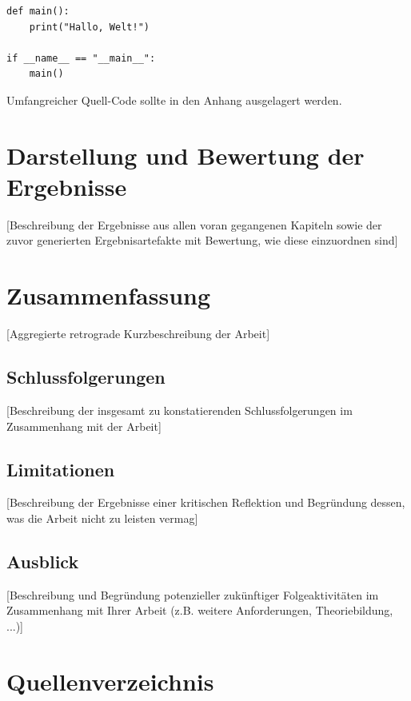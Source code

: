 \documentclass[oneside,bibliography=totocnumbered,BCOR=5mm]{scrbook}
\begin{document}
\begin{lstlisting}[caption={Beispiel: Hello World (Python)}]
def main():
    print("Hallo, Welt!")

if __name__ == "__main__":
    main()
\end{lstlisting}

Umfangreicher Quell-Code sollte in den Anhang ausgelagert werden.

\chapter{Darstellung und Bewertung der Ergebnisse}
[Beschreibung der Ergebnisse aus allen voran gegangenen Kapiteln sowie der zuvor generierten Ergebnisartefakte mit Bewertung, wie diese einzuordnen sind]

\chapter{Zusammenfassung}
[Aggregierte retrograde Kurzbeschreibung der Arbeit]

\section{Schlussfolgerungen}
[Beschreibung der insgesamt zu konstatierenden Schlussfolgerungen im Zusammenhang mit der Arbeit]

\section{Limitationen}
[Beschreibung der Ergebnisse einer kritischen Reflektion und Begründung dessen, was die Arbeit nicht zu leisten vermag]

\section{Ausblick}
[Beschreibung und Begründung potenzieller zukünftiger Folgeaktivitäten im Zusammenhang mit Ihrer Arbeit (z.B. weitere Anforderungen, Theoriebildung, ...)]

\chapter*{Quellenverzeichnis}
\printbibliography[heading=none,title={}]

\appendix
{}
\end{document}
